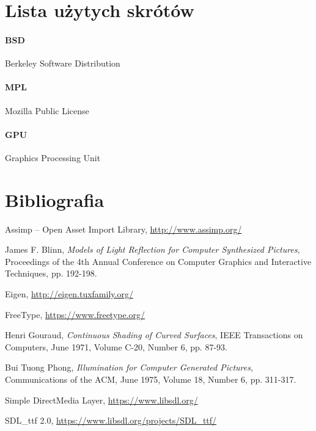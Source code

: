 \documentclass[10pt,a4paper]{article}
\begin{document}
\section{Lista użytych skrótów}

\label{abbr:bsd}
\paragraph{BSD} Berkeley Software Distribution

\label{abbr:mpl}
\paragraph{MPL} Mozilla Public License

\label{abbr:gpu}
\paragraph{GPU} Graphics Processing Unit

\renewcommand*{\refname}{\vspace*{-2em}}
\section{Bibliografia}
\begin{thebibliography}{99}

	Assimp -- Open Asset Import Library,
	\url{http://www.assimp.org/}

	James F. Blinn,
	\emph{Models of Light Reflection for Computer Synthesized Pictures},
	Proceedings of the 4th Annual Conference on Computer Graphics and Interactive Techniques,
	pp. 192-198.

	Eigen,
	\url{http://eigen.tuxfamily.org/}

	FreeType,
	\url{https://www.freetype.org/}
	
	Henri Gouraud,
	\emph{Continuous Shading of Curved Surfaces},
	IEEE Transactions on Computers,
	June 1971, Volume C-20, Number 6,
	pp. 87-93.

	Bui Tuong Phong,
	\emph{Illumination for Computer Generated Pictures},
	Communications of the ACM,
	June 1975, Volume 18, Number 6,
	pp. 311-317.

	Simple DirectMedia Layer,
	\url{https://www.libsdl.org/}

	SDL\_ttf 2.0,
	\url{https://www.libsdl.org/projects/SDL_ttf/}
\end{thebibliography}
\end{document}
